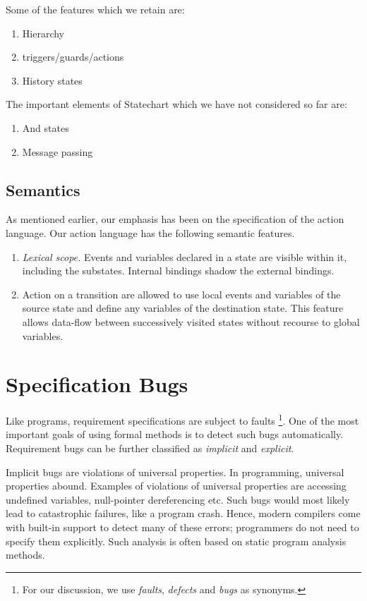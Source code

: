 \documentclass[12pt,a4paper]{article}
\begin{document}
Some of the features which we retain are:
\begin{enumerate}
	\item Hierarchy
	\item triggers/guards/actions
	\item History states
\end{enumerate}
The important elements of Statechart which we have not considered so far are:
\begin{enumerate}
	\item And states
	\item Message passing
\end{enumerate}
\subsection{Semantics}
As mentioned earlier, our emphasis has been on the specification of the action language. Our action language has the following semantic features.
\begin{enumerate}
	\item \emph{Lexical scope.} Events and variables declared in a state are visible within it, including the substates. Internal bindings shadow the external bindings.
	\item Action on a transition are allowed to use local events and variables of the source state and define any variables of the destination state. This feature allows data-flow between successively visited states without recourse to global variables.
\end{enumerate}

\section{Specification Bugs} \label{s:sb}
Like programs, requirement specifications are subject to faults \footnote{For our discussion, we use \emph{faults}, \emph{defects} and \emph{bugs} as synonyms.}. One of the most important goals of using formal methods is to detect such bugs automatically. Requirement bugs can be further classified as \emph{implicit} and \emph{explicit}.

Implicit bugs are violations of universal properties. In programming, universal properties abound. Examples of violations of universal properties are accessing undefined variables, null-pointer dereferencing etc. Such bugs would most likely lead to catastrophic failures, like a program crash. Hence, modern compilers come with built-in support to detect many of these errors; programmers do not need to specify them explicitly. Such analysis is often based on static program analysis methods.
\end{document}
